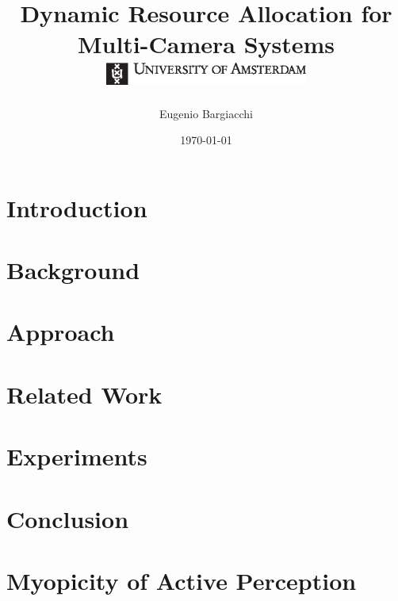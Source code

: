 \documentclass[10pt,twoside]{report}
\title{
    {Dynamic Resource Allocation for Multi-Camera Systems}\\\vspace{1cm}
    {\includegraphics[width=0.5\textwidth]{UvA-logo}}
}
\author{Eugenio Bargiacchi}
\date{\today}
\begin{document}
\maketitle

\begin{abstract}

\end{abstract}


\tableofcontents

\chapter{Introduction}\label{ref:intro}


\chapter{Background}\label{ref:background}



\chapter{Approach}\label{ref:approach}


\chapter{Related Work}\label{ref:relwork}


\chapter{Experiments}\label{ref:experiments}


\chapter{Conclusion}\label{ref:conclusion}


\nocite{*}
\appendix

\chapter{Myopicity of Active Perception}\label{ref:appendix_proof}




\end{document}
